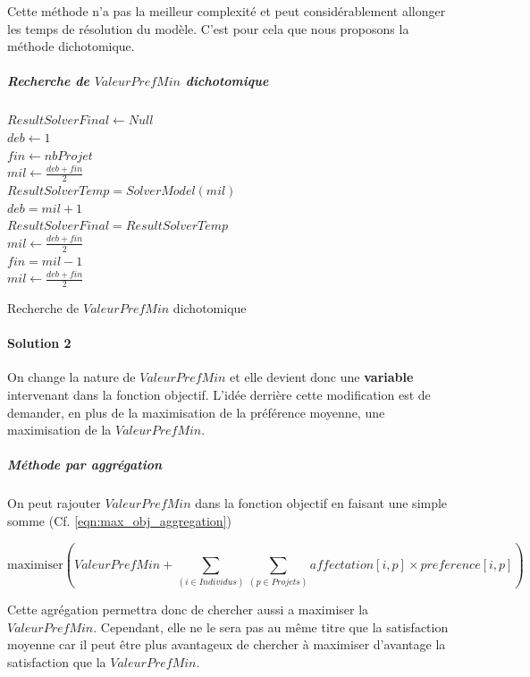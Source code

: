 \documentclass[final,poster]{polytech/polytech}
\begin{document}
Cette méthode n'a pas la meilleur complexité et peut considérablement allonger les temps de résolution du modèle. C'est pour cela que nous proposons la méthode dichotomique.

\subparagraph{Recherche de $ValeurPrefMin$ dichotomique}
\begin{algorithm}
$ResultSolverFinal \gets Null$ \\
$deb \gets 1$ \\
$fin \gets nbProjet$ \\
$mil \gets \frac{deb+fin}{2}$ \\
{
	$ResultSolverTemp=SolverModel(mil)$\\
{
$deb=mil+1$\\
$ResultSolverFinal=ResultSolverTemp$\\
$mil \gets \frac{deb+fin}{2}$ \\
}
\Else
{
	$fin=mil-1$\\
	$mil \gets \frac{deb+fin}{2}$ \\
}
}

\caption{\label{chap:problem_affectation:algo:recherche_dichotomique}Recherche de $ValeurPrefMin$ dichotomique}
\end{algorithm}
\paragraph{Solution 2}
On change la nature de $ValeurPrefMin$ et elle devient donc une \textbf{variable} intervenant dans la fonction objectif.
L'idée derrière cette modification est de demander, en plus de la maximisation de la préférence moyenne, une maximisation de la $ValeurPrefMin$.

\subparagraph{Méthode par aggrégation}
On peut rajouter $ValeurPrefMin$ dans la fonction objectif en faisant une simple somme (Cf. \eqref{eqn:max_obj_aggregation})

\begin{equation}
\label{eqn:max_obj_aggregation}
\text{maximiser} \left( ValeurPrefMin + \sum_{(i \in Individus)} \sum_{(p\in Projets)} affectation[i,p]\times preference[i,p] \right)
\end{equation}

Cette agrégation permettra donc de chercher aussi a maximiser la $ValeurPrefMin$. Cependant, elle ne le sera pas au même titre que la satisfaction moyenne car il peut être plus avantageux de chercher à maximiser d'avantage la satisfaction que la $ValeurPrefMin$.
\end{document}
